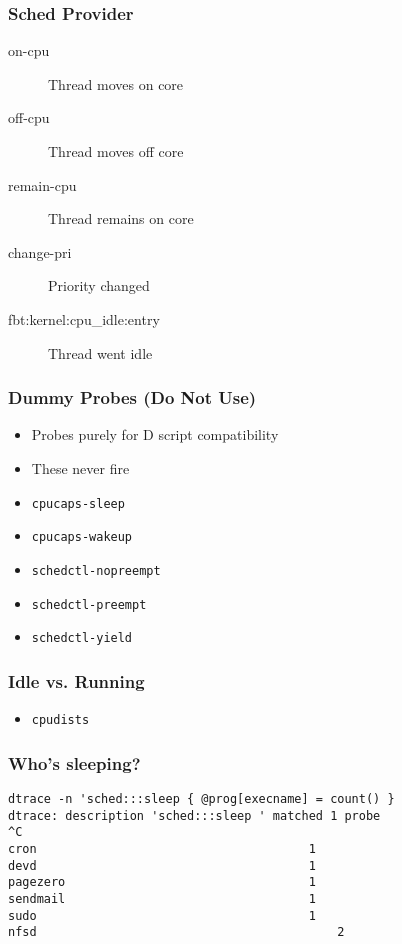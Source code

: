 \documentclass[pdftex]{beamer}
\begin{document}
\begin{frame}[fragile]
  \frametitle{Sched Provider}
  \begin{description}
  \item[on-cpu] Thread moves on core
  \item[off-cpu] Thread moves off core
  \item[remain-cpu] Thread remains on core
  \item[change-pri] Priority changed
  \item[fbt:kernel:cpu\_idle:entry] Thread went idle
  \end{description}
\end{frame}

\begin{frame}[fragile]
  \frametitle{Dummy Probes (Do Not Use)}
  \begin{itemize}
  \item Probes purely for D script compatibility
  \item These never fire
  \item \verb+cpucaps-sleep+
  \item \verb+cpucaps-wakeup+
  \item \verb+schedctl-nopreempt+
  \item \verb+schedctl-preempt+
  \item \verb+schedctl-yield+
  \end{itemize}
\end{frame}

\begin{frame}[fragile]
  \frametitle{Idle vs. Running}
  \begin{itemize}
  \item \verb+cpudists+
  \end{itemize}
\end{frame}

\begin{frame}[fragile]
  \frametitle{Who's sleeping?}
\begin{lstlisting}
dtrace -n 'sched:::sleep { @prog[execname] = count() }
dtrace: description 'sched:::sleep ' matched 1 probe
^C
cron                                      1
devd                                      1
pagezero                                  1
sendmail                                  1
sudo                                      1
nfsd                                          2
\end{lstlisting}
\end{frame}
\end{document}
